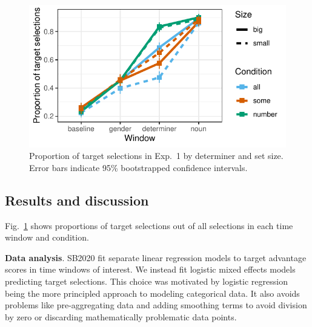 \documentclass[10pt,letterpaper]{article}
\newcommand{\figref}[1]{Fig.~\ref{#1}}
\newcommand{\expref}[1]{Exp.~#1}
\newcommand{\jd}[1]{\textcolor{Red}{\textbf{[jd: #1]}}}
\begin{document}
\begin{figure}[tbh!]
\centering
\includegraphics[width=\columnwidth]{../../analysis/SunBreheny/1_incremental/main/graphs/results-target-all-looks}
\caption{Proportion of target selections in \expref{1} by determiner and set size. Error bars indicate 95\% bootstrapped confidence intervals.} 
\label{fig:results-idt}
\end{figure}

\subsection{Results and discussion}


\figref{fig:results-idt} shows proportions of target selections out of all selections in each time window and condition. 


\textbf{Data analysis}. SB2020 fit separate linear regression models to target advantage scores in time windows of interest. We instead fit logistic mixed effects models predicting target selections. This choice was motivated by logistic regression being the more principled approach to modeling categorical data. It also avoids problems like pre-aggregating data and adding smoothing terms to avoid division by zero or discarding mathematically problematic data points. %
\end{document}
